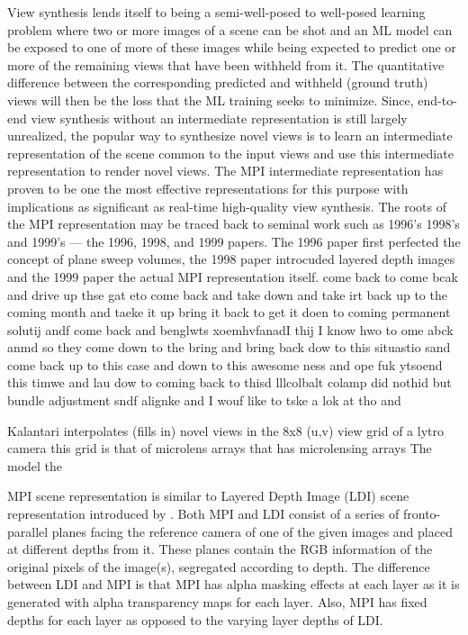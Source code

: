 View synthesis lends itself to being a semi-well-posed to well-posed learning problem where two or more images of a scene can be shot and an ML model can be exposed to one of more of these images while being expected to predict one or more of the remaining views that have been withheld from it. The quantitative difference between the corresponding predicted and withheld (ground truth) views will then be the loss that the ML training seeks to minimize. Since, end-to-end view synthesis without an intermediate representation is still largely unrealized, the popular way to synthesize novel views is to learn an intermediate representation of the scene common to the input views and use this intermediate representation to render novel views. The MPI intermediate representation has proven to be one the most effective representations for this purpose with implications as significant as real-time high-quality view synthesis. The roots of the MPI representation may be traced back to seminal work such as 1996's \cite{collins_space-sweep_1996} 1998's \cite{fft} and 1999's \cite{fft} --- the 1996, 1998, and 1999 papers. The 1996 paper first perfected the concept of plane sweep volumes, the 1998 paper introcuded layered depth images and the 1999 paper the actual MPI representation itself.
come back to come bcak and drive up thse gat eto come back and take down and take irt back up to the coming month and taeke it up bring it back to get it doen to coming permanent solutij andf come back and benglwts xoemhvfanadI thij I know hwo to ome abck anmd so they come down to the bring  and bring back dow to this situastio sand come back up to this case and down to this awesome ness and ope fuk ytsoend this timwe and lau dow to coming back to thisd lllcolbalt colamp did nothid but bundle adjustment sndf alignke and I wouf like to tske a lok at tho and 

Kalantari interpolates (fills in) novel views in the 8x8 (u,v) view grid of a lytro camera this grid is that of microlens arrays that has microlensing arrays 
The model the 

MPI scene representation is similar to Layered Depth Image (LDI) scene representation introduced by \cite{layered_depth_images}. Both MPI and LDI consist of a series of fronto-parallel planes facing the reference camera of one of the given images and placed at different depths from it. These planes contain the RGB information of the original pixels of the image(s), segregated according to depth. The difference between LDI and MPI is that MPI has alpha masking effects at each layer as it is generated with alpha transparency maps for each layer. Also, MPI has fixed depths for each layer as opposed to the varying layer depths of LDI.

